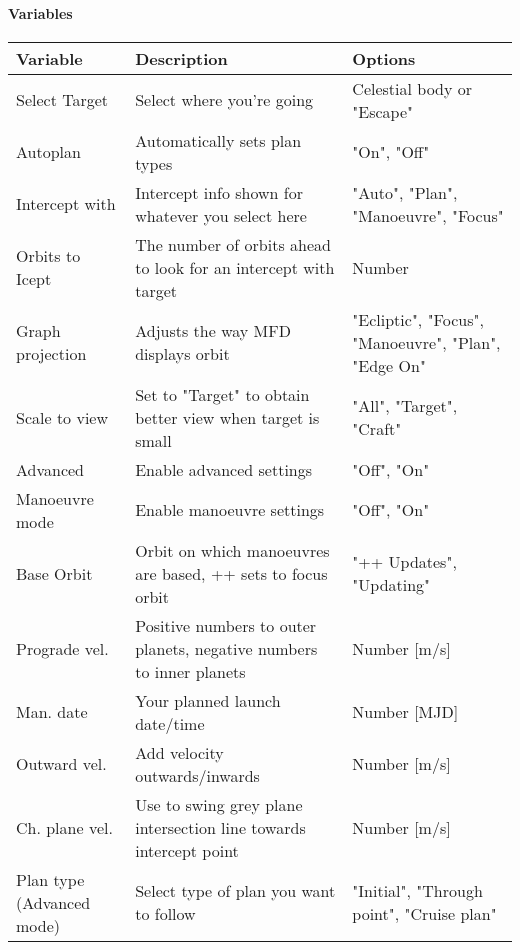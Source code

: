 \documentclass[Orbiter User Manual.tex]{subfiles}
\begin{document}
\paragraph{Variables}
	\begin{longtable}{ |p{}|p{}|p{}| }
	\hline\rule{0pt}{2ex}
	\textbf{Variable} & \textbf{Description} & \textbf{Options}\\
	\hline\rule{0pt}{2ex}
	Select Target & Select where you're going & Celestial body or "Escape"\\%
	\hline\rule{0pt}{2ex}
	Autoplan & Automatically sets plan types & "On", "Off"\\
	\hline\rule{0pt}{2ex}
	Intercept with & Intercept info shown for whatever you select here & "Auto", "Plan", "Manoeuvre", "Focus"\\
	\hline\rule{0pt}{2ex}
	Orbits to Icept & The number of orbits ahead to look for an intercept with target & Number\\
	\hline\rule{0pt}{2ex}
	Graph projection & Adjusts the way MFD displays orbit & "Ecliptic", "Focus", "Manoeuvre", "Plan", "Edge On"\\
	\hline\rule{0pt}{2ex}
	Scale to view & Set to "Target" to obtain better view when target is small & "All", "Target", "Craft"\\
	\hline\rule{0pt}{2ex}
	Advanced & Enable advanced settings & "Off", "On"\\
	\hline\rule{0pt}{2ex}
	Manoeuvre mode & Enable manoeuvre settings & "Off", "On"\\
	\hline\rule{0pt}{2ex}
	Base Orbit & Orbit on which manoeuvres are based, ++ sets to focus orbit & "++ Updates", "Updating"\\
	\hline\rule{0pt}{2ex}
	Prograde vel. & Positive numbers to outer planets, negative numbers to inner planets & Number [m/s]\\
	\hline\rule{0pt}{2ex}
	Man. date & Your planned launch date/time & Number [MJD]\\
	\hline\rule{0pt}{2ex}
	Outward vel. & Add velocity outwards/inwards & Number [m/s]\\
	\hline\rule{0pt}{2ex}
	Ch. plane vel. & Use to swing grey plane intersection line towards intercept point & Number [m/s]\\
	\hline\rule{0pt}{2ex}
	Plan type (Advanced mode) & Select type of plan you want to follow & "Initial", "Through point", "Cruise plan"\\

\end{longtable}
\end{document}
